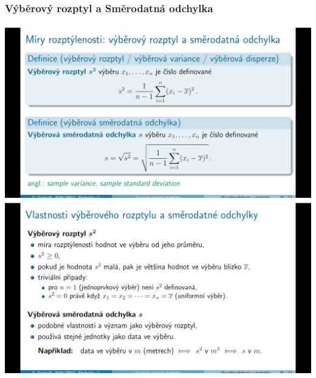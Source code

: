 \subsubsection{Výběrový rozptyl a Směrodatná odchylka}
\begin{center}
	\includegraphics[scale=0.32]{img/rozptyl_odchylka}
	\includegraphics[scale=0.32]{img/rozptyl_odchylka_properties}
\end{center}
\newpage
